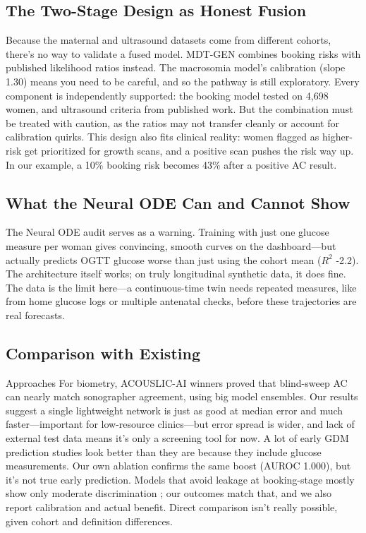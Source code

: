 \documentclass[conference]{IEEEtran}
\begin{document}
\subsection{The Two-Stage Design as Honest Fusion}

Because the maternal and ultrasound datasets come from different cohorts, there's no way to validate a fused model. MDT-GEN combines booking risks with published likelihood ratios instead. The macrosomia model's calibration (slope 1.30) means you need to be careful, and so the pathway is still exploratory. Every component is independently supported: the booking model tested on 4,698 women, and ultrasound criteria from published work. But the combination must be treated with caution, as the ratios may not transfer cleanly or account for calibration quirks. This design also fits clinical reality: women flagged as higher-risk get prioritized for growth scans, and a positive scan pushes the risk way up. In our example, a 10\% booking risk becomes 43\% after a positive AC result.



\subsection{What the Neural ODE Can and Cannot Show}

The Neural ODE audit serves as a warning. Training with just one glucose measure per woman gives convincing, smooth curves on the dashboard---but actually predicts OGTT glucose worse than just using the cohort mean ($R^2$ -2.2). The architecture itself works; on truly longitudinal synthetic data, it does fine. The data is the limit here---a continuous-time twin needs repeated measures, like from home glucose logs or multiple antenatal checks, before these trajectories are real forecasts.



\subsection{Comparison with Existing}

Approaches For biometry, ACOUSLIC-AI winners \cite{r18} proved that blind-sweep AC can nearly match sonographer agreement, using big model ensembles. Our results suggest a single lightweight network is just as good at median error and much faster---important for low-resource clinics---but error spread is wider, and lack of external test data means it's only a screening tool for now. A lot of early GDM prediction studies look better than they are because they include glucose measurements. Our own ablation confirms the same boost (AUROC 1.000), but it's not true early prediction. Models that avoid leakage at booking-stage mostly show only moderate discrimination \cite{r4,r5}; our outcomes match that, and we also report calibration and actual benefit. Direct comparison isn't really possible, given cohort and definition differences.
\end{document}
